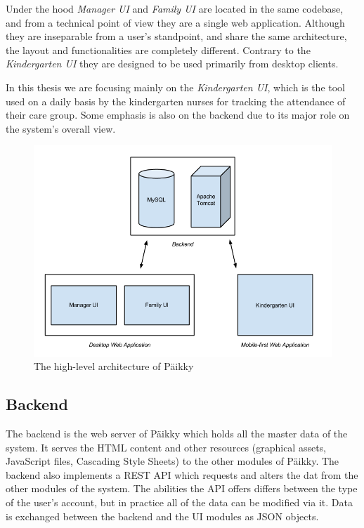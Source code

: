 Under the hood \textit{Manager UI} and \textit{Family UI} are located in the same codebase, and from a technical point of view they are a single web application. Although they are inseparable from a user's standpoint, and share the same architecture, the layout and functionalities are completely different. Contrary to the \textit{Kindergarten UI} they are designed to be used primarily from desktop clients. 

In this thesis we are focusing mainly on the \textit{Kindergarten UI}, which is the tool used on a daily basis by the kindergarten nurses for tracking the attendance of their care group. Some emphasis is also on the backend due to its major role on the system's overall view.

\begin{figure}[t]
\begin{center}
\includegraphics[width=1\textwidth]{assets/architecture.png}
\end{center}
\caption{The high-level architecture of Päikky}
\label{fig:architecture}
\end{figure}



\subsection{Backend}

The backend is the web server of Päikky which holds all the master data of the system. It serves the HTML content and other resources (graphical assets, JavaScript files, Cascading Style Sheets) to the other modules of Päikky. The backend also implements a REST API which requests and alters the dat from the other modules of the system. The abilities the API offers differs between the type of the user's account, but in practice all of the data can be modified via it. Data is exchanged between the backend and the UI modules as JSON objects.

